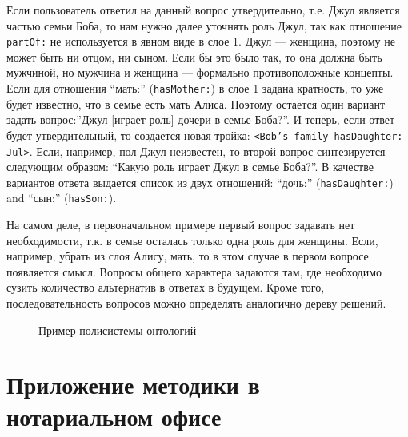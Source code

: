 \documentclass[utf8]{../IncArticle}
\begin{document}
Если пользователь ответил на данный вопрос утвердительно, т.е. Джул
является частью семьи Боба, то нам нужно далее уточнять роль Джул, так
как отношение \texttt{partOf:} не используется в явном виде в слое 1.
Джул --- женщина, поэтому не может быть ни отцом, ни сыном. Если бы
это было так, то она должна быть мужчиной, но мужчина и женщина ---
формально противоположные концепты.  Если для отношения
``мать:'' (\texttt{hasMother:}) в слое 1 задана кратность, то уже будет известно, что
в семье есть мать Алиса.  Поэтому остается один вариант задать
вопрос:''Джул [играет роль] дочери в семье Боба?''.  И теперь, если
ответ будет утвердительный, то создается новая тройка:
\texttt{<Bob's-family hasDaughter: Jul>}. Если, например, пол Джул
неизвестен, то второй вопрос синтезируется следующим образом: ``Какую
роль играет Джул в семье Боба?''.  В качестве вариантов ответа
выдается список из двух отношений: ``дочь:'' (\texttt{hasDaughter:})
and ``сын:'' (\texttt{hasSon:}).

На самом деле, в первоначальном примере первый вопрос задавать нет
необходимости, т.к. в семье осталась только одна роль для женщины.
Если, например, убрать из слоя Алису, мать, то в этом случае в первом
вопросе появляется смысл.  Вопросы общего характера задаются там, где
необходимо сузить количество альтернатив в ответах в будущем.  Кроме
того, последовательность вопросов можно определять аналогично дереву
решений.

\begin{figure}
\begin{center}
\sf
\def\svgwidth{0.7\linewidth}

\end{center}
\caption{Пример полисистемы онтологий}
\label{OPSA}
\end{figure}










\section{Приложение методики в нотариальном офисе}
\end{document}
